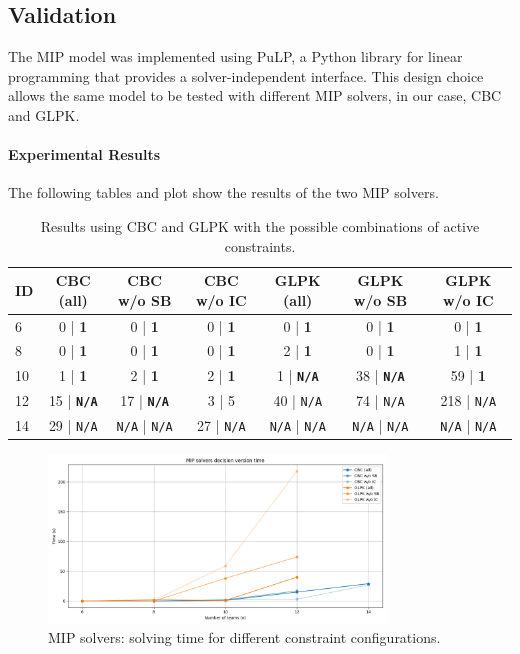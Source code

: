 \documentclass[11pt]{article}
\begin{document}
\subsection{Validation}

The MIP model was implemented using PuLP, a Python library for linear programming that provides a solver-independent interface. This design choice allows the same model to be tested with different MIP solvers, in our case, CBC and GLPK.

\paragraph{Experimental Results} The following tables and plot show the results of the two MIP solvers.

\begin{table}[H]
\centering
\small
\label{tab:mip}
\begin{tabular}{@{}lcccccc@{}}
\toprule
ID & CBC (all) & CBC w/o SB & CBC w/o IC & GLPK (all) & GLPK w/o SB & GLPK w/o IC \\
\midrule
6 & 0 | \textbf{1} & 0 | \textbf{1} & 0 | \textbf{1} & 0 | \textbf{1} & 0 | \textbf{1} & 0 | \textbf{1}\\
8 & 0 | \textbf{1} & 0 | \textbf{1} & 0 | \textbf{1} & 2 | \textbf{1} & 0 | \textbf{1} & 1 | \textbf{1}\\
10 & 1 | \textbf{1} & 2 | \textbf{1} & 2 | \textbf{1} & 1 | \textbf{\texttt{N/A}} & 38 | \textbf{\texttt{N/A}} & 59 | \textbf{1}\\
12 & 15 | \textbf{\texttt{N/A}} & 17 | \textbf{\texttt{N/A}} & 3 | 5 & 40 | \texttt{N/A}& 74 | \texttt{N/A}& 218 | \texttt{N/A}\\
14 & 29 | \texttt{N/A} & \texttt{N/A} | \texttt{N/A} & 27 | \texttt{N/A} & \texttt{N/A} | \texttt{N/A} & \texttt{N/A} | \texttt{N/A}& \texttt{N/A} | \texttt{N/A}\\
\bottomrule
\end{tabular}
\caption{Results using CBC and GLPK with the possible combinations of active constraints.}
\end{table}

\begin{figure}[H]
    \centering
    \includegraphics[width=0.8\textwidth]{mip_plot.png}
    \caption{MIP solvers: solving time for different constraint configurations.}
    \label{fig:mip_plot}
\end{figure}
\end{document}
